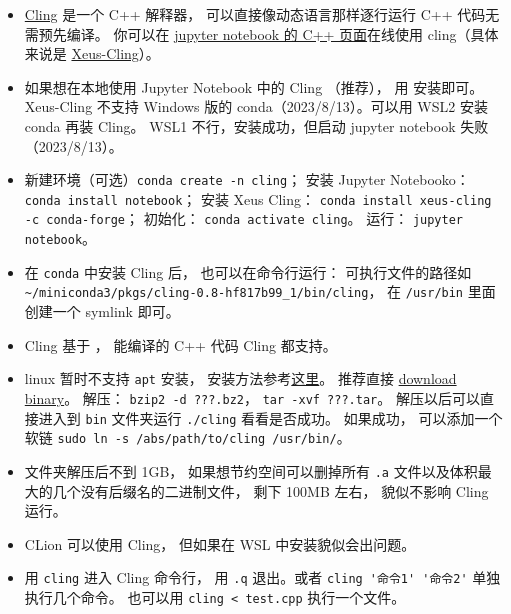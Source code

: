 
\begin{issues}
\issueDraft
\end{issues}


\begin{itemize}
\item \href{https://root.cern/cling/}{Cling} 是一个 C++ 解释器， 可以直接像动态语言那样逐行运行 C++ 代码无需预先编译。
你可以在 \href{https://jupyter.org/try}{jupyter notebook 的 C++ 页面}在线使用 cling（具体来说是 \href{https://xeus-cling.readthedocs.io/en/latest/index.html}{Xeus-Cling}）。
\item 如果想在本地使用 Jupyter Notebook 中的 Cling （推荐）， 用  安装即可。 Xeus-Cling 不支持 Windows 版的 conda（2023/8/13）。可以用 WSL2 安装 conda 再装 Cling。 WSL1 不行，安装成功，但启动 jupyter notebook 失败（2023/8/13）。
\item 新建环境（可选）\verb`conda create -n cling`； 安装 Jupyter Notebooko：\verb`conda install notebook`； 安装 Xeus Cling： \verb`conda install xeus-cling -c conda-forge`； 初始化： \verb`conda activate cling`。 运行： \verb`jupyter notebook`。
\item 在 \verb`conda` 中安装 Cling 后， 也可以在命令行运行： 可执行文件的路径如 \verb`~/miniconda3/pkgs/cling-0.8-hf817b99_1/bin/cling`， 在 \verb`/usr/bin` 里面创建一个 symlink 即可。
\item Cling 基于 ，  能编译的 C++ 代码 Cling 都支持。
\item linux 暂时不支持 \verb`apt` 安装， 安装方法参考\href{https://kaustubh13.medium.com/how-to-install-cling-on-linux-or-wsl-8125798ed9b9}{这里}。 推荐直接 \href{https://root.cern/download/cling/}{download binary}。 解压： \verb`bzip2 -d ???.bz2`， \verb`tar -xvf ???.tar`。 解压以后可以直接进入到 \verb`bin` 文件夹运行 \verb`./cling` 看看是否成功。 如果成功， 可以添加一个软链 \verb`sudo ln -s /abs/path/to/cling /usr/bin/`。
\item 文件夹解压后不到 1GB， 如果想节约空间可以删掉所有 \verb`.a` 文件以及体积最大的几个没有后缀名的二进制文件， 剩下 100MB 左右， 貌似不影响 Cling 运行。
\item CLion 可以使用 Cling， 但如果在 WSL 中安装貌似会出问题。
\item 用 \verb`cling` 进入 Cling 命令行， 用 \verb`.q` 退出。或者 \verb`cling '命令1' '命令2'` 单独执行几个命令。 也可以用 \verb`cling < test.cpp` 执行一个文件。

\end{itemize}
